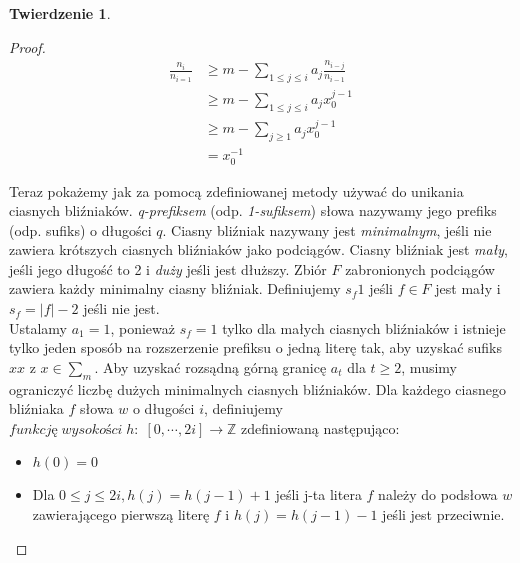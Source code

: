 \documentclass[11pt,a4paper]{article}
\theoremstyle{definition}
\newtheorem{theorem}{Twierdzenie}[section]
\begin{document}
\begin{theorem}
\begin{proof}
\begin{equation}
\begin{split}
\frac{n_i}{n_{i=1}} & \geqslant m - \sum\limits_{1\leqslant j\leqslant i} a_{j} \frac{n_{i-j}}{n_{i-1}} \\
& \geqslant m - \sum\limits_{1\leqslant j\leqslant i} a_{j} x_0^{j-1} \\
& \geqslant m - \sum\limits_{j \geqslant 1} a_{j} x_0^{j-1} \\
& = x_0^{-1}
\end{split}
\end{equation}

Teraz pokażemy jak za pomocą zdefiniowanej metody używać do unikania ciasnych bliźniaków.
\textit{q-prefiksem} (odp. \textit{1-sufiksem}) słowa nazywamy jego prefiks (odp. sufiks) o długości $q$.
Ciasny bliźniak nazywany jest \textit{minimalnym}, jeśli nie zawiera krótszych ciasnych bliźniaków jako podciągów.
Ciasny bliźniak jest \textit{mały}, jeśli jego długość to 2 i \textit{duży} jeśli jest dłuższy.
Zbiór $F$ zabronionych podciągów zawiera każdy minimalny ciasny bliźniak.
Definiujemy $s_f 1$ jeśli $f \in F$ jest mały i $s_f = |f| - 2$ jeśli nie jest.
\\
Ustalamy $a_1 = 1$, ponieważ $s_f=1$ tylko dla małych ciasnych bliźniaków i istnieje tylko jeden sposób
na rozszerzenie prefiksu o jedną literę tak, aby uzyskać sufiks $xx$ z $x \in \sum\limits_m$.
Aby uzyskać rozsądną górną granicę $a_t$ dla $t \geqslant 2$,
musimy ograniczyć liczbę dużych minimalnych ciasnych bliźniaków.
Dla każdego ciasnego bliźniaka $f$ słowa $w$ o długości $i$,
definiujemy $funkcję \; wysokości \; h: \; [0,\cdots,2i] \rightarrow \mathbb{Z}$ zdefiniowaną następująco:
\begin{itemize}
\item $h(0) = 0$
\item Dla $0\leqslant j \leqslant 2i, h(j) = h(j-1) + 1$ jeśli j-ta litera $f$ należy do podsłowa $w$
zawierającego pierwszą literę $f$ i $h(j) = h(j-1) -1$ jeśli jest przeciwnie.
\end{itemize}


\end{proof}
\end{theorem}
\end{document}
